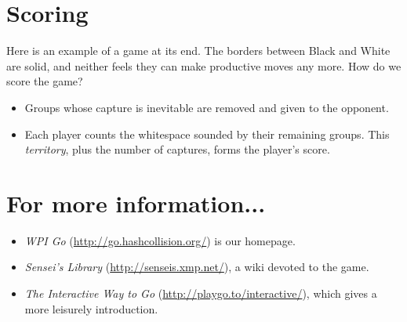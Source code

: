 \documentclass{article}
\begin{document}
\section*{Scoring}

Here is an example of a game at its end.
The borders between Black and White are solid, and neither feels they
can make productive moves any more.  How do we score the game?
\begin{itemize}
\item Groups whose capture is inevitable are removed and given to the
  opponent.

\item Each player counts the whitespace sounded by their remaining
  groups.  This \emph{territory}, plus the number of captures, forms
  the player's score.
\end{itemize}




\section*{For more information...}
\begin{itemize}
\item \emph{WPI Go} (\url{http://go.hashcollision.org/}) is our homepage.

\item \emph{Sensei's Library} (\url{http://senseis.xmp.net/}), a wiki
  devoted to the game.

\item \emph{The Interactive Way to Go}
  (\url{http://playgo.to/interactive/}), which gives a more leisurely
  introduction.
\end{itemize}
\end{document}
